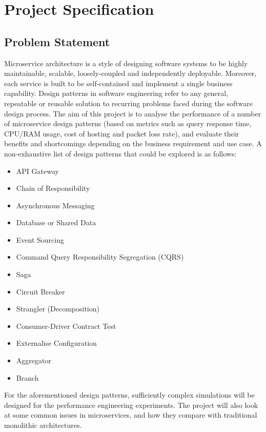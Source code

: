\chapter{Project Specification}

\section{Problem Statement}
Microservice architecture is a style of designing software systems to be highly maintainable, scalable, loosely-coupled and independently deployable. Moreover, each service is built to be self-contained and implement a single business capability. Design patterns in software engineering refer to any general, repeatable or reusable solution \cite{wikiDP} to recurring problems faced during the software design process. The aim of this project is to analyse the performance of a number of microservice design patterns (based on metrics such as query response time, CPU/RAM usage, cost of hosting and packet loss rate), and evaluate their benefits and shortcomings depending on the business requirement and use case. A non-exhaustive list of design patterns that could be explored is as follows:

\begin{itemize}
	\item API Gateway
	\item Chain of Responsibility
	\item Asynchronous Messaging
	\item Database or Shared Data
	\item Event Sourcing
	\item Command Query Responsibility Segregation (CQRS)
	\item Saga
	\item Circuit Breaker
	\item Strangler (Decomposition)
	\item Consumer-Driver Contract Test
	\item Externalise Configuration
	\item Aggregator
	\item Branch
\end{itemize}

For the aforementioned design patterns, sufficiently complex simulations will be designed for the performance engineering experiments. The project will also look at some common issues in microservices, and how they compare with traditional monolithic architectures.

\pagebreak
